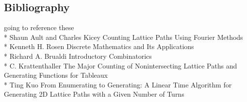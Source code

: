 \documentclass{article}
\begin{document}
 
 \subsection*{Bibliography}
 going to reference these\\*
 Shaun Ault and Charles Kicey Counting Lattice Paths Using Fourier Methods\\*
 Kenneth H. Rosen Discrete Mathematics and Its Applications\\*
 Richard A. Brualdi Introductory Combinatorics\\*
 C. Krattenthaller The Major Counting of Nonintersecting Lattice Paths and Generating Functions for Tableaux\\*
 Ting Kuo From Enumerating to Generating: A Linear Time Algorithm for Generating 2D Lattice Paths with a Given Number of Turns
 

 
\end{document}
